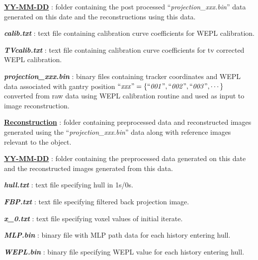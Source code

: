 \documentclass[landscape]{article}
\begin{document}
\begin{myEnumerate}[labelindent=0pt, leftmargin=*]
\begin{myEnumerate}[labelindent=1pt, leftmargin=*]
\begin{myEnumerate}[labelindent=1pt, leftmargin=*]
\begin{myEnumerate}[labelindent=1pt, leftmargin=*]
\begin{myEnumerate}[labelindent=1pt, leftmargin=*]
\begin{myEnumerate}[labelindent=1pt, leftmargin=*]
                        \item \ul{\textbf{YY-MM-DD}} : folder containing the post processed ``\textit{projection\_xxx.bin}'' data generated on this date and the reconstructions using this data.
                        \begin{myEnumerate}[labelindent=1pt, leftmargin=*]
                            \item \textbf{\textit{calib.txt}} : text file containing calibration curve coefficients for WEPL calibration.
                            \item \textbf{\textit{TVcalib.txt}} : text file containing calibration curve coefficients for tv corrected WEPL calibration.
                            \item \textbf{\textit{projection\_xxx.bin}} : binary files containing tracker coordinates and WEPL data associated with gantry position $\textrm{``\textit{xxx}''} =\{\textrm{``\textit{001}''}, \textrm{``\textit{002}''}, \textrm{``\textit{003}''}, \cdots\}$ converted from raw data using WEPL calibration routine and used as input to image reconstruction.
                            \item \ul{\textbf{Reconstruction}} : folder containing preprocessed data and reconstructed images generated using the ``\textit{projection\_xxx.bin}'' data along with reference images relevant to the object.
                            \begin{myEnumerate}[labelindent=1pt, leftmargin=*]
                                \item \ul{\textbf{YY-MM-DD}} : folder containing the preprocessed data generated on this date and the reconstructed images generated from this data.
                                \begin{myEnumerate}[labelindent=1pt, leftmargin=*]
                                    \item \textbf{\textit{hull.txt}} : text file specifying hull in 1s/0s.
                                    \item \textbf{\textit{FBP.txt}} : text file specifying filtered back projection image.
                                    \item \textbf{\textit{x\_0.txt}} : text file specifying voxel values of initial iterate.
                                    \item \textbf{\textit{MLP.bin}} : binary file with MLP path data for each history entering hull.
                                    \item \textbf{\textit{WEPL.bin}} : binary file specifying WEPL value for each history entering hull.

\end{myEnumerate}
\end{myEnumerate}
\end{myEnumerate}
\end{myEnumerate}
\end{myEnumerate}
\end{myEnumerate}
\end{myEnumerate}
\end{myEnumerate}
\end{myEnumerate}
\end{document}
